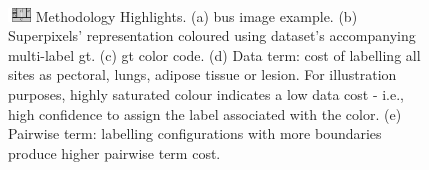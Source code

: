 \begin{figure}[t]
    \hfill
    \begin{subfigure}[b]{0.23\textwidth}
        \centering
        \label{fig:methodTerms:boundary}
    \end{subfigure}
    \\
    \centering
    \begin{subfigure}[b]{\textwidth}
        \centering
        
        \label{fig:methodTerms:gt}
    \end{subfigure}

    \caption {
      \protect\includegraphics[height=1em]{fig_legend.pdf}
      \small Methodology Highlights.
      (a) \acs{bus} image example.
      (b) Superpixels' representation coloured using dataset's accompanying multi-label \acs{gt}.
      (c) \ac{gt} color code.
      (d) Data term: cost of labelling all sites as pectoral, lungs, adipose tissue or lesion.
      For illustration purposes, highly saturated colour indicates a low data cost - i.e., high confidence to assign the label associated with the color.
      (e) Pairwise term: labelling configurations with more boundaries produce higher pairwise term cost.}
    \label{fig:methodTerms}
\end{figure}

